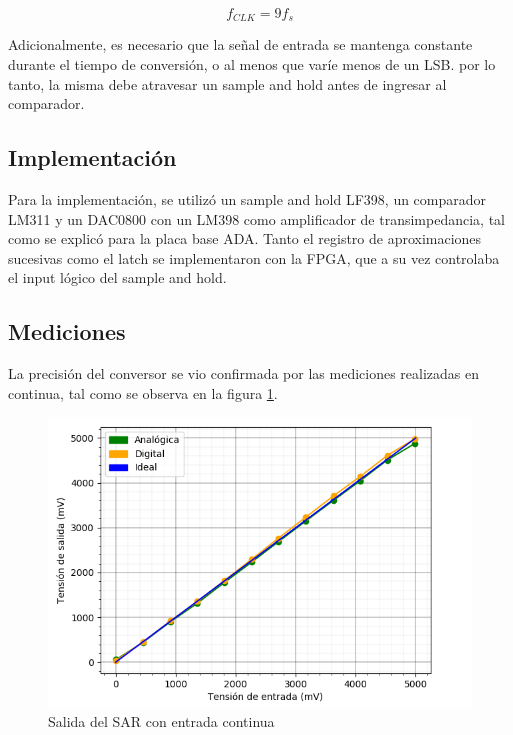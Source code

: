 \documentclass[assd_tp3_main.tex]{subfiles}
\begin{document}
\begin{equation}
	f_{CLK} = 9f_s
\end{equation} 

Adicionalmente, es necesario que la se\~nal de entrada se mantenga constante durante el tiempo de conversi\'on, o al menos que var\'ie menos de un LSB. por lo tanto, la misma debe atravesar un sample and hold antes de ingresar al comparador.



\subsection{Implementaci\'on}

Para la implementaci\'on, se utiliz\'o un sample and hold LF398, un comparador LM311 y un DAC0800 con un LM398 como amplificador de transimpedancia, tal como se explic\'o para la placa base ADA. Tanto el registro de aproximaciones sucesivas como el latch se implementaron con la FPGA, que a su vez controlaba el input l\'ogico del sample and hold. 


\subsection{Mediciones}

La precisi\'on del conversor se vio confirmada por las mediciones realizadas en continua, tal como se observa en la figura \ref{fig:sar-continua}.

\begin{figure}[htb!]
	\centering
	\includegraphics[width=\textwidth]
	{images/ej2/sar-continua.png}
	\caption{Salida del SAR con entrada continua}
	\label{fig:sar-continua}
\end{figure}
\end{document}
